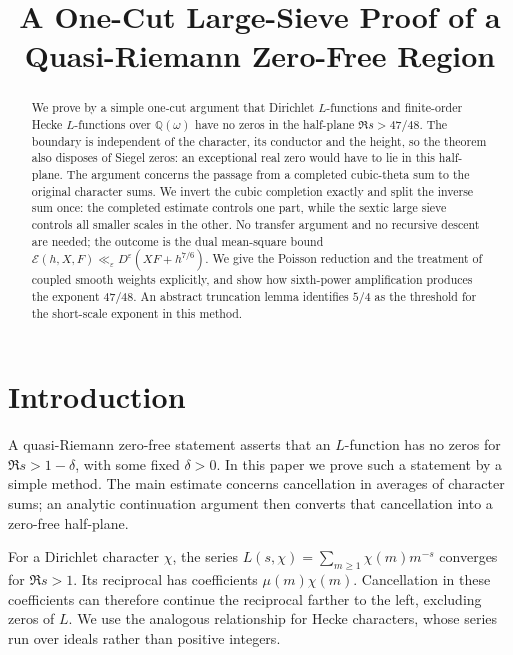 \documentclass[reqno,a4paper,11pt]{amsart}
\begin{document}
\title[One-cut large-sieve proof]{A One-Cut Large-Sieve Proof of a Quasi-Riemann Zero-Free Region}
\ifx\PaperAuthor\empty\else\author{\PaperAuthor}\fi
\ifx\PaperAffiliation\empty\else\address{\PaperAffiliation}\fi
\ifx\PaperEmail\empty\else\email{\PaperEmail}\fi
{}
\begin{abstract}
We prove by a simple one-cut argument that Dirichlet $L$-functions and finite-order Hecke $L$-functions over $\mathbb{Q}(\omega)$ have no zeros in the half-plane $\Re s>47/48$. The boundary is independent of the character, its conductor and the height, so the theorem also disposes of Siegel zeros: an exceptional real zero would have to lie in this half-plane. The argument concerns the passage from a completed cubic-theta sum to the original character sums. We invert the cubic completion exactly and split the inverse sum once: the completed estimate controls one part, while the sextic large sieve controls all smaller scales in the other. No transfer argument and no recursive descent are needed; the outcome is the dual mean-square bound $\mathcal{E}(h,X,F)\ll_{\varepsilon}D^{\varepsilon}(XF+h^{7/6})$. We give the Poisson reduction and the treatment of coupled smooth weights explicitly, and show how sixth-power amplification produces the exponent $47/48$. An abstract truncation lemma identifies $5/4$ as the threshold for the short-scale exponent in this method.
\end{abstract}
\maketitle

\section{Introduction}

A quasi-Riemann zero-free statement asserts that an $L$-function has no zeros for $\Re s>1-\delta$, with some fixed $\delta>0$. In this paper we prove such a statement by a simple method. The main estimate concerns cancellation in averages of character sums; an analytic continuation argument then converts that cancellation into a zero-free half-plane.

For a Dirichlet character $\chi$, the series $L(s,\chi)=\sum_{m\ge1}\chi(m)m^{-s}$ converges for $\Re s>1$. Its reciprocal has coefficients $\mu(m)\chi(m)$. Cancellation in these coefficients can therefore continue the reciprocal farther to the left, excluding zeros of $L$. We use the analogous relationship for Hecke characters, whose series run over ideals rather than positive integers.
\end{document}
